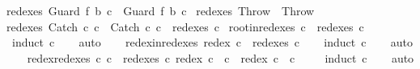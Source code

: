 \begin{isabellebody}
{\isachardoublequoteopen}redexes\ {\isacharparenleft}Guard\ f\ b\ c{\isacharparenright}\ {\isacharequal}\ {\isacharbraceleft}Guard\ f\ b\ c{\isacharbraceright}{\isachardoublequoteclose}\ {\isacharbar}\isanewline
{\isachardoublequoteopen}redexes\ {\isacharparenleft}Throw{\isacharparenright}\ {\isacharequal}\ {\isacharbraceleft}Throw{\isacharbraceright}{\isachardoublequoteclose}\ {\isacharbar}\isanewline
{\isachardoublequoteopen}redexes\ {\isacharparenleft}Catch\ c\ c\ {\isacharequal}\ {\isacharbraceleft}Catch\ c\ c\ {\isasymunion}\ redexes\ c\isanewline
\isanewline
{}\isamarkupfalse%
\ root{\isacharunderscore}in{\isacharunderscore}redexes{\isacharcolon}\ {\isachardoublequoteopen}c\ {\isasymin}\ redexes\ c{\isachardoublequoteclose}\isanewline
%
\isadelimproof
\ \ %
\endisadelimproof
%
\isatagproof
{}\isamarkupfalse%
\ {\isacharparenleft}induct\ c{\isacharparenright}\isanewline
\ \ \isamarkupfalse%
\ auto\isanewline
\ \ \isamarkupfalse%
%
\endisatagproof
{\isafoldproof}%
%
\isadelimproof
\isanewline
%
\endisadelimproof
\isanewline
{}\isamarkupfalse%
\ redex{\isacharunderscore}in{\isacharunderscore}redexes{\isacharcolon}\ {\isachardoublequoteopen}redex\ c\ {\isasymin}\ redexes\ c{\isachardoublequoteclose}\isanewline
%
\isadelimproof
\ \ %
\endisadelimproof
%
\isatagproof
{}\isamarkupfalse%
\ {\isacharparenleft}induct\ c{\isacharparenright}\isanewline
\ \ \isamarkupfalse%
\ auto\isanewline
\ \ \isamarkupfalse%
%
\endisatagproof
{\isafoldproof}%
%
\isadelimproof
\isanewline
%
\endisadelimproof
\isanewline
{}\isamarkupfalse%
\ redex{\isacharunderscore}redexes{\isacharcolon}\ {\isachardoublequoteopen}{\isasymAnd}c{\isacharprime}{\isachardot}\ {\isasymlbrakk}c{\isacharprime}\ {\isasymin}\ redexes\ c{\isacharsemicolon}\ redex\ c{\isacharprime}\ {\isacharequal}\ c{\isacharprime}{\isasymrbrakk}\ {\isasymLongrightarrow}\ redex\ c\ {\isacharequal}\ c{\isacharprime}{\isachardoublequoteclose}\ \isanewline
%
\isadelimproof
\ \ %
\endisadelimproof
%
\isatagproof
{}\isamarkupfalse%
\ {\isacharparenleft}induct\ c{\isacharparenright}\isanewline
\ \ \isamarkupfalse%
\ auto\isanewline
\ \ \isamarkupfalse%
%
\endisatagproof
{\isafoldproof}%
%
\isadelimproof
\isanewline
%
\endisadelimproof

\end{isabellebody}
